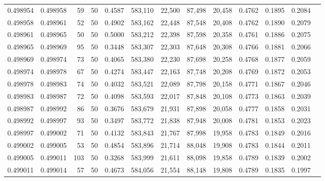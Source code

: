 \begin{tabular}{rrrrrrrrrrrrr}
0.498954 & 0.498958 &    59 &  50 &                                     0.4587 & 583,110 &  22,500 &  87,498 &  20,458 & 0.4762 & 0.1895 & 0.2084 \\
0.498958 & 0.498961 &    52 &  50 &                                     0.4902 & 583,162 &  22,448 &  87,548 &  20,408 & 0.4762 & 0.1890 & 0.2079 \\
0.498961 & 0.498965 &    50 &  50 &                                     0.5000 & 583,212 &  22,398 &  87,598 &  20,358 & 0.4761 & 0.1886 & 0.2075 \\
0.498965 & 0.498969 &    95 &  50 &                                     0.3448 & 583,307 &  22,303 &  87,648 &  20,308 & 0.4766 & 0.1881 & 0.2066 \\
0.498969 & 0.498974 &    73 &  50 &                                     0.4065 & 583,380 &  22,230 &  87,698 &  20,258 & 0.4768 & 0.1877 & 0.2059 \\
0.498974 & 0.498978 &    67 &  50 &                                     0.4274 & 583,447 &  22,163 &  87,748 &  20,208 & 0.4769 & 0.1872 & 0.2053 \\
0.498978 & 0.498983 &    74 &  50 &                                     0.4032 & 583,521 &  22,089 &  87,798 &  20,158 & 0.4771 & 0.1867 & 0.2046 \\
0.498983 & 0.498987 &    72 &  50 &                                     0.4098 & 583,593 &  22,017 &  87,848 &  20,108 & 0.4773 & 0.1863 & 0.2039 \\
0.498987 & 0.498992 &    86 &  50 &                                     0.3676 & 583,679 &  21,931 &  87,898 &  20,058 & 0.4777 & 0.1858 & 0.2031 \\
0.498992 & 0.498997 &    93 &  50 &                                     0.3497 & 583,772 &  21,838 &  87,948 &  20,008 & 0.4781 & 0.1853 & 0.2023 \\
0.498997 & 0.499002 &    71 &  50 &                                     0.4132 & 583,843 &  21,767 &  87,998 &  19,958 & 0.4783 & 0.1849 & 0.2016 \\
0.499002 & 0.499005 &    53 &  50 &                                     0.4854 & 583,896 &  21,714 &  88,048 &  19,908 & 0.4783 & 0.1844 & 0.2011 \\
0.499005 & 0.499011 &   103 &  50 &                                     0.3268 & 583,999 &  21,611 &  88,098 &  19,858 & 0.4789 & 0.1839 & 0.2002 \\
0.499011 & 0.499014 &    57 &  50 &                                     0.4673 & 584,056 &  21,554 &  88,148 &  19,808 & 0.4789 & 0.1835 & 0.1997 \\

\end{tabular}
